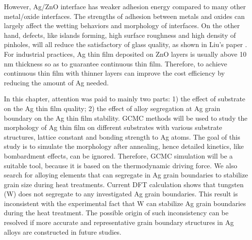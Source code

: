 However, Ag/ZnO interface has weaker adhesion energy compared to many other metal/oxide interfaces. The strengths of adhesion between metals and oxides can largely affect the wetting behaviors and morphology of interfaces. On the other hand, defects, like islands forming, high surface roughness and high density of pinholes, will all reduce the satisfactory of glass quality, as shown in Liu's paper \cite{liu2013lithography}. For industrial practices, Ag thin film deposited on ZnO layers is usually above 10 nm thickness so as to guarantee continuous thin film. Therefore, to achieve continuous thin film with thinner layers can improve the cost efficiency by reducing the amount of Ag needed.

In this chapter, attention was paid to mainly two parts: 1) the effect of substrate on the Ag thin film quality; 2) the effect of alloy segregation at Ag grain boundary on the Ag thin film stability. \ac{GCMC} methods will be used to study the morphology of Ag thin film on different substrates with various substrate structures, lattice constant and bonding strength to Ag atoms. The goal of this study is to simulate the morphology after annealing, hence detailed kinetics, like bombardment effects, can be ignored. Therefore, \ac{GCMC} simulation will be a suitable tool, because it is based on the thermodynamic driving force. We also search for alloying elements that can segregate in Ag grain boundaries to stabilize grain size during heat treatments. Current \ac{DFT} calculation shows that tungsten (W) does not segregate to any investigated Ag grain boundaries. This result is inconsistent with the experimental fact that W can stabilize Ag grain boundaries during the heat treatment. The possible origin of such inconsistency can be resolved if more accurate and representative grain boundary structures in Ag alloys are constructed in future studies.